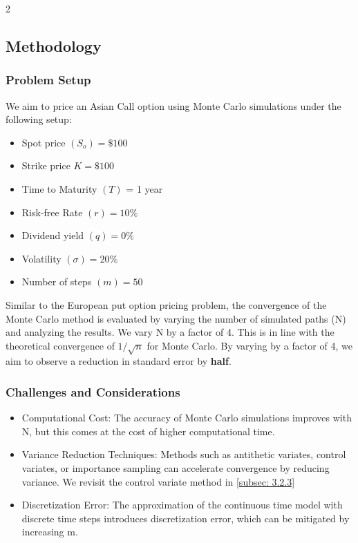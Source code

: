 \begin{multicols}{2}
\subsection{Methodology}

\subsubsection{Problem Setup}

We aim to price an Asian Call option using Monte Carlo simulations under the following setup:

\begin{itemize}
    \item Spot price $(S_o) = \$100$
    \item Strike price $K = \$100 $
    \item Time to Maturity $(T)$ = 1 year
    \item Risk-free Rate $(r) = 10\%$
    \item Dividend yield $(q) = 0\%$
    \item Volatility $(\sigma) = 20\%$
    \item Number of steps $(m) = 50$
\end{itemize}

Similar to the European put option pricing problem, the convergence of the Monte Carlo method is evaluated by varying the number of simulated paths (N) and analyzing the results. We vary N by a factor of 4. This is in line with the theoretical convergence of $1/\sqrt{n}$ for Monte Carlo. By varying by a factor of 4, we aim to observe a reduction in standard error by \textbf{half}.

\subsubsection{Challenges and Considerations}

\begin{itemize}
    \item Computational Cost: The accuracy of Monte Carlo simulations improves with N, but this comes at the cost of higher computational time.
    \item Variance Reduction Techniques: Methods such as antithetic variates, control variates, or importance sampling can accelerate convergence by reducing variance. We revisit the control variate method in \ref{subsec: 3.2.3}
    \item Discretization Error: The approximation of the continuous time model with discrete time steps introduces discretization error, which can be mitigated by increasing m.
\end{itemize}


\end{multicols}
